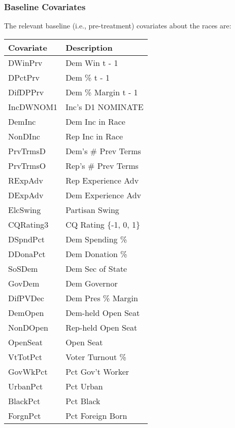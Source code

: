 \documentclass[11pt,leqno]{article}\usepackage[]{graphicx}\usepackage[]{color}
\newenvironment{knitrout}{}{} %
\theoremstyle{newstyle}
\begin{document}
\subsubsection{Baseline Covariates}

The relevant baseline (i.e., pre-treatment) covariates about the races are:

\begin{knitrout}\footnotesize
{}\color{fgcolor}
\begin{tabular}{l|l}
\hline
Covariate & Description\\
\hline
DWinPrv & Dem Win t - 1\\
\hline
DPctPrv & Dem \% t - 1\\
\hline
DifDPPrv & Dem \% Margin t - 1\\
\hline
IncDWNOM1 & Inc's D1 NOMINATE\\
\hline
DemInc & Dem Inc in Race\\
\hline
NonDInc & Rep Inc in Race\\
\hline
PrvTrmsD & Dem's \# Prev Terms\\
\hline
PrvTrmsO & Rep's \# Prev Terms\\
\hline
RExpAdv & Rep Experience Adv\\
\hline
DExpAdv & Dem Experience Adv\\
\hline
ElcSwing & Partisan Swing\\
\hline
CQRating3 & CQ Rating \{-1, 0, 1\}\\
\hline
DSpndPct & Dem Spending \%\\
\hline
DDonaPct & Dem Donation \%\\
\hline
SoSDem & Dem Sec of State\\
\hline
GovDem & Dem Governor\\
\hline
DifPVDec & Dem Pres \% Margin\\
\hline
DemOpen & Dem-held Open Seat\\
\hline
NonDOpen & Rep-held Open Seat\\
\hline
OpenSeat & Open Seat\\
\hline
VtTotPct & Voter Turnout \%\\
\hline
GovWkPct & Pct Gov't Worker\\
\hline
UrbanPct & Pct Urban\\
\hline
BlackPct & Pct Black\\
\hline
ForgnPct & Pct Foreign Born\\
\hline
\end{tabular}


\end{knitrout}
\end{document}
